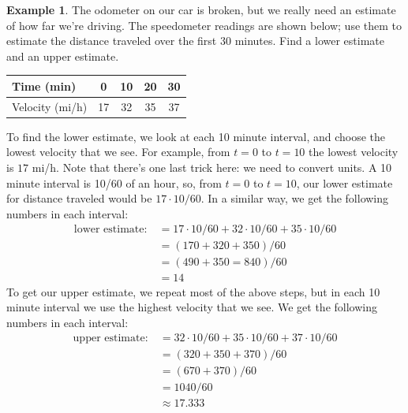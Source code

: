 \documentclass[oneside]{book}
\theoremstyle{definition}
\newtheorem{example}{Example}
\theoremstyle{solution}
\newtheorem*{solution}{Solution}
\newenvironment{solution}{\vspace{2in}\comment}{\endcomment}
\begin{document}
\begin{example}
  The odometer on our car is broken, but we really need an estimate of
  how far we're driving.  The speedometer readings are shown below;
  use them to estimate the distance traveled over the first 30
  minutes.  Find a lower estimate and an upper estimate.
  \begin{center}
    \begin{tabular}{l|c|c|c|c}\hline
      Time (min) & 0 & 10 & 20 & 30 \\ \hline
      Velocity (mi/h) & 17 & 32 & 35 & 37 \\ \hline
    \end{tabular}
  \end{center}
\end{example}

\begin{solution}
  To find the lower estimate, we look at each 10 minute interval, and
  choose the lowest velocity that we see.  For example, from $t=0$ to
  $t=10$ the lowest velocity is $17$ mi/h.  Note that there's one last
  trick here: we need to convert units.  A 10 minute interval is 10/60
  of an hour, so, from $t=0$ to $t=10$, our lower estimate for
  distance traveled would be $17\cdot 10/60$.  In a similar way, we
  get the following numbers in each interval:
\begin{align*}
  \text{lower estimate:}\  & = 17\cdot 10/60 + 32\cdot 10/60 + 35\cdot 10/60 \\
                           & = (170+320+350)/60 \\
                           & = (490+350=840)/60 \\
                           & = 14
\end{align*}
To get our upper estimate, we repeat most of the above steps, but in
each 10 minute interval we use the highest velocity that we see.  We
get the following numbers in each interval:
\begin{align*}
  \text{upper estimate:} \ & =32\cdot 10/60 + 35\cdot 10/60 + 37\cdot 10/60\\
                           &  = (320+350+370)/60 \\
                           & = (670+370)/60\\
                           & =1040/60 \\
                           & \approx 17.333
\end{align*}
\end{solution}
\end{document}
